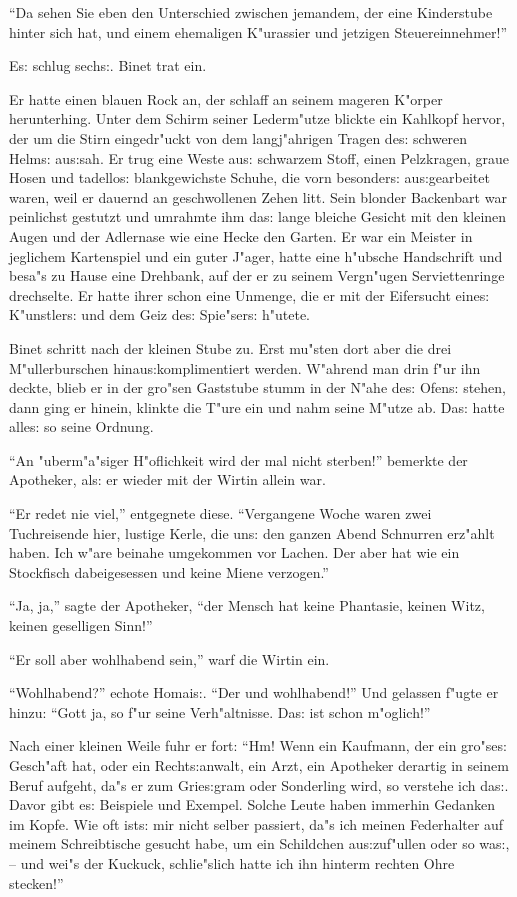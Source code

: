 \documentclass[oneside,12pt]{book}
\newcommand{\s}{s:}%
\begin{document}
"`Da sehen Sie eben den Unterschied zwischen jemandem, der eine
Kinderstube hinter sich hat, und einem ehemaligen K"urassier und
jetzigen Steuereinnehmer!"'

E{\s} schlug sech{\s}. Binet trat ein.

Er hatte einen blauen Rock an, der schlaff an seinem mageren
K"orper herunterhing. Unter dem Schirm seiner Lederm"utze blickte
ein Kahlkopf hervor, der um die Stirn eingedr"uckt von dem
langj"ahrigen Tragen de{\s} schweren Helm{\s} au{\s}sah. Er trug
eine Weste au{\s} schwarzem Stoff, einen Pelzkragen, graue Hosen
und tadello{\s} blankgewichste Schuhe, die vorn besonder{\s}
au{\s}gearbeitet waren, weil er dauernd an geschwollenen Zehen
litt. Sein blonder Backenbart war peinlichst gestutzt und umrahmte
ihm da{\s} lange bleiche Gesicht mit den kleinen Augen und der
Adlernase wie eine Hecke den Garten. Er war ein Meister in
jeglichem Kartenspiel und ein guter J"ager, hatte eine h"ubsche
Handschrift und besa"s zu Hause eine Drehbank, auf der er zu
seinem Vergn"ugen Serviettenringe drechselte. Er hatte ihrer schon
eine Unmenge, die er mit der Eifersucht eine{\s} K"unstler{\s} und
dem Geiz de{\s} Spie"ser{\s} h"utete.

Binet schritt nach der kleinen Stube zu. Erst mu"sten dort aber
die drei M"ullerburschen hinau{\s}komplimentiert werden. W"ahrend
man drin f"ur ihn deckte, blieb er in der gro"sen Gaststube stumm
in der N"ahe de{\s} Ofen{\s} stehen, dann ging er hinein, klinkte
die T"ure ein und nahm seine M"utze ab. Da{\s} hatte alle{\s} so
seine Ordnung.

"`An "uberm"a"siger H"oflichkeit wird der mal nicht sterben!"'
bemerkte der Apotheker, al{\s} er wieder mit der Wirtin allein
war.

"`Er redet nie viel,"' entgegnete diese. "`Vergangene Woche waren
zwei Tuchreisende hier, lustige Kerle, die un{\s} den ganzen Abend
Schnurren erz"ahlt haben. Ich w"are beinahe umgekommen vor Lachen.
Der aber hat wie ein Stockfisch dabeigesessen und keine Miene
verzogen."'

"`Ja, ja,"' sagte der Apotheker, "`der Mensch hat keine Phantasie,
keinen Witz, keinen geselligen Sinn!"'

"`Er soll aber wohlhabend sein,"' warf die Wirtin ein.

"`Wohlhabend?"' echote Homai{\s}. "`Der und wohlhabend!"' Und
gelassen f"ugte er hinzu: "`Gott ja, so f"ur seine Verh"altnisse.
Da{\s} ist schon m"oglich!"'

Nach einer kleinen Weile fuhr er fort: "`Hm! Wenn ein Kaufmann,
der ein gro"se{\s} Gesch"aft hat, oder ein Recht{\s}anwalt, ein
Arzt, ein Apotheker derartig in seinem Beruf aufgeht, da"s er zum
Grie{\s}gram oder Sonderling wird, so verstehe ich da{\s}. Davor
gibt e{\s} Beispiele und Exempel. Solche Leute haben immerhin
Gedanken im Kopfe. Wie oft ist{\s} mir nicht selber passiert, da"s
ich meinen Federhalter auf meinem Schreibtische gesucht habe, um
ein Schildchen au{\s}zuf"ullen oder so wa{\s}, -- und wei"s der
Kuckuck, schlie"slich hatte ich ihn hinterm rechten Ohre
stecken!"'
\end{document}
